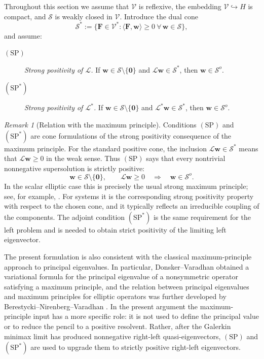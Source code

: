 \documentclass[preprint,10pt]{elsarticle}
\theoremstyle{plain}
\theoremstyle{definition}
\theoremstyle{remark}
\newtheorem{remark}{Remark}
\begin{document}
Throughout this section we assume that \(\mathcal V\) is reflexive, the
embedding \(\mathcal V\hookrightarrow H\) is compact, and \(\mathcal S\) is
weakly closed in \(\mathcal V\). Introduce the dual cone
\[
\mathcal S^*
:=
\{\mathbf F\in\mathcal V^*:
\langle\mathbf F,\mathbf w\rangle\ge0
\ \forall\,\mathbf w\in\mathcal S\},
\]
and assume:

\begin{description}
	\item[$\mathrm{(SP)}$] \emph{Strong positivity of \(\mathcal L\).}
	If \(\mathbf w\in\mathcal S\setminus\{\mathbf0\}\) and
	\(\mathcal L\mathbf w\in\mathcal S^*\), then
	\(\mathbf w\in\mathcal S^o\).
	
	\item[$\mathrm{(SP^*)}$] \emph{Strong positivity of \(\mathcal L^*\).}
	If \(\mathbf w\in\mathcal S\setminus\{\mathbf0\}\) and
	\(\mathcal L^*\mathbf w\in\mathcal S^*\), then
	\(\mathbf w\in\mathcal S^o\).
\end{description}

\begin{remark}[Relation with the maximum principle]
	Conditions \(\mathrm{(SP)}\) and \(\mathrm{(SP^*)}\) are cone formulations
	of the strong positivity consequence of the maximum principle. For the
	standard positive cone, the inclusion
	\(\mathcal L\mathbf w\in\mathcal S^*\) means that
	\(\mathcal L\mathbf w\ge0\) in the weak sense. Thus \(\mathrm{(SP)}\) says
	that every nontrivial nonnegative supersolution is strictly positive:
	\[
	\mathbf w\in\mathcal S\setminus\{\mathbf0\},
	\qquad
	\mathcal L\mathbf w\ge0
	\quad\Longrightarrow\quad
	\mathbf w\in\mathcal S^o .
	\]
	In the scalar elliptic case this is precisely the usual strong maximum
	principle; see, for example, \cite{ProtterWeinberger}. For systems it is the
	corresponding strong positivity property with respect to the chosen cone,
	and it typically reflects an irreducible coupling of the components. The
	adjoint condition \(\mathrm{(SP^*)}\) is the same requirement for the left
	problem and is needed to obtain strict positivity of the limiting left
	eigenvector.
	
	The present formulation is also consistent with the classical
	maximum-principle approach to principal eigenvalues. In particular,
	Donsker--Varadhan \cite{Donsker} obtained a variational formula for the
	principal eigenvalue of a nonsymmetric operator satisfying a maximum
	principle, and the relation between principal eigenvalues and maximum
	principles for elliptic operators was further developed by
	Berestycki--Nirenberg--Varadhan \cite{BerestNienbVardan}. In the present
	argument the maximum-principle input has a more specific role: it is not used
	to define the principal value or to reduce the pencil to a positive
	resolvent. Rather, after the Galerkin minimax limit has produced nonnegative
	right-left quasi-eigenvectors, \(\mathrm{(SP)}\) and \(\mathrm{(SP^*)}\) are
	used to upgrade them to strictly positive right-left eigenvectors.
\end{remark}
\end{document}
